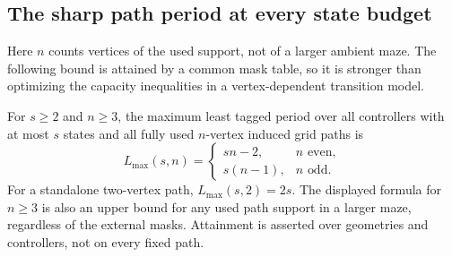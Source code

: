 \subsection{The sharp path period at every state budget}\label{sec:sharp-period}

Here $n$ counts vertices of the used support, not of a larger ambient maze.
The following bound is attained by a common mask table, so it is stronger than
optimizing the capacity inequalities in a vertex-dependent transition model.

\begin{theorem}\label{thm:sharp-period}
For $s\ge2$ and $n\ge3$, the maximum least tagged period over all controllers with
at most $s$ states and all fully used $n$-vertex induced grid paths is
\[
 L_{\max}(s,n)=
 \begin{cases}
 sn-2,&n\text{ even},\\
 s(n-1),&n\text{ odd}.
 \end{cases}
\]
For a standalone two-vertex path, $L_{\max}(s,2)=2s$.
The displayed formula for $n\ge3$ is also an upper bound for any used path support
in a larger maze, regardless of the external masks. Attainment is asserted over
geometries and controllers, not on every fixed path.
\end{theorem}
